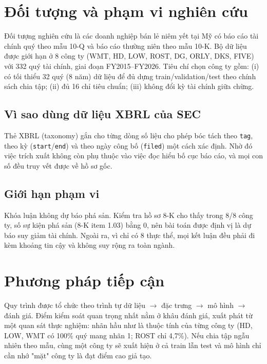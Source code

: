 \section{Đối tượng và phạm vi nghiên cứu}

Đối tượng nghiên cứu là các doanh nghiệp bán lẻ niêm yết tại Mỹ có báo cáo tài chính quý theo mẫu
10-Q và báo cáo thường niên theo mẫu 10-K. Bộ dữ liệu được giới hạn ở 8 công ty (WMT, HD, LOW,
ROST, DG, ORLY, DKS, FIVE) với 332 quý tài chính, giai đoạn FY2015--FY2026. Tiêu chí chọn công ty
gồm: (i) có tối thiểu 32 quý (8 năm) dữ liệu để đủ dựng train/validation/test theo chính sách chia
tập; (ii) đủ 16 chỉ tiêu chuẩn; (iii) không đổi kỳ tài chính giữa chừng.

\subsection{Vì sao dùng dữ liệu XBRL của SEC}

Thẻ XBRL (taxonomy) gắn cho từng dòng số liệu cho phép bóc tách theo \texttt{tag}, theo kỳ
(\texttt{start}/\texttt{end}) và theo ngày công bố (\texttt{filed}) một cách xác định. Nhờ đó việc
trích xuất không còn phụ thuộc vào việc đọc hiểu bố cục báo cáo, và mọi con số đều truy vết được
về hồ sơ gốc.

\subsection{Giới hạn phạm vi}

Khóa luận không dự báo phá sản. Kiểm tra hồ sơ 8-K cho thấy trong 8/8 công ty, số sự kiện phá sản
(8-K item 1.03) bằng 0, nên bài toán được định vị là dự báo suy giảm tài chính. Ngoài ra, vì chỉ có
8 thực thể, mọi kết luận đều phải đi kèm khoảng tin cậy và không suy rộng ra toàn ngành.

\section{Phương pháp tiếp cận}

Quy trình được tổ chức theo trình tự dữ liệu $\rightarrow$ đặc trưng $\rightarrow$ mô hình
$\rightarrow$ đánh giá. Điểm kiểm soát quan trọng nhất nằm ở khâu đánh giá, xuất phát từ một quan
sát thực nghiệm: nhãn hầu như là thuộc tính của từng công ty (HD, LOW, WMT có 100\% quý mang nhãn 1;
ROST chỉ 4,7\%). Nếu chia tập ngẫu nhiên theo mẫu, cùng một công ty sẽ xuất hiện ở cả train lẫn test
và mô hình chỉ cần nhớ "mặt" công ty là đạt điểm cao giả tạo.

